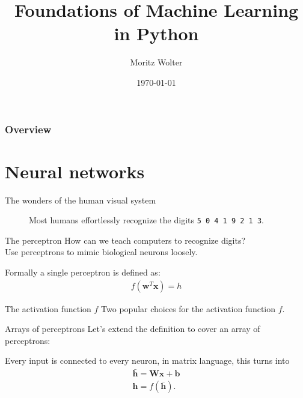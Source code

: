 \documentclass[notes]{beamer}
\title{Foundations of Machine Learning in Python}
\date{\today}
\institute{High-Performance Computing and Analytics Lab}
\author{Moritz Wolter}
\begin{document}
    \maketitle

    \begin{frame}
    \frametitle{Overview} 
    \tableofcontents
    \end{frame}

    \section{Neural networks}
    \begin{frame}{The wonders of the human visual system}
      \begin{figure}
        
        \caption{Most humans effortlessly recognize the digits \texttt{5 0 4 1 9 2 1 3}.}
      \end{figure}
    \end{frame}

    \begin{frame}{The perceptron}
      How can we teach computers to recognize digits? \\
      Use perceptrons to mimic biological neurons loosely.
      \begin{figure}
        
      \end{figure}
      Formally a single perceptron is defined as:
      \begin{align}
        f(\mathbf{w}^T \mathbf{x}) = h
      \end{align}
    \end{frame}

    \begin{frame}{The activation function $f$}
      Two popular choices for the activation function $f$.
      \begin{figure}
        
        
      \end{figure}
    \end{frame}

    \begin{frame}{Arrays of perceptrons}
      Let's extend the definition to cover an array of perceptrons:
      \begin{figure}
        
      \end{figure}
      Every input is connected to every neuron, in matrix language, this turns into
      \begin{align}
        \bar{\mathbf{h}} = \mathbf{W}\mathbf{x} + \mathbf{b} \\
        \mathbf{h} = f(\bar{\mathbf{h}}).
      \end{align}
    \end{frame}
\end{document}
